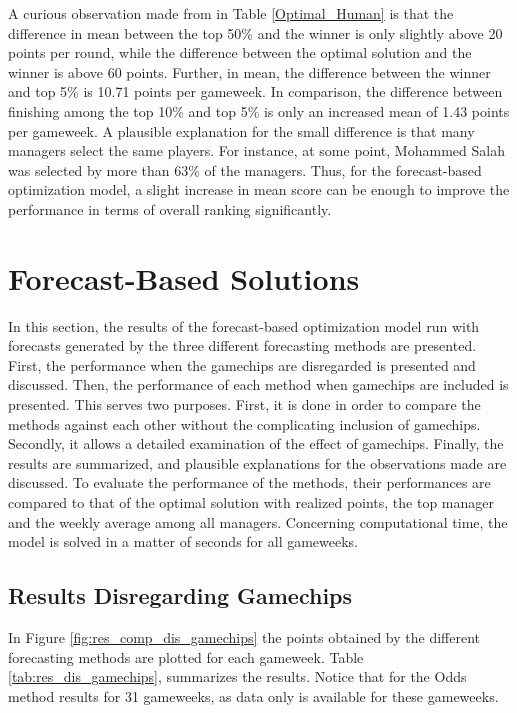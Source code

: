 A curious observation made from in Table \ref{Optimal_Human} is that the difference in mean between the top 50\% and the winner is only slightly above 20 points per round, while the difference between the optimal solution and the winner is above 60 points. Further, in mean, the difference between the winner and top 5\% is 10.71 points per gameweek. In comparison, the difference between finishing among the top 10\% and top 5\% is only an increased mean of 1.43 points per gameweek. A plausible explanation for the small difference is that many managers select the same players. For instance, at some point, Mohammed Salah was selected by more than 63\% of the managers. Thus, for the forecast-based optimization model, a slight increase in mean score can be enough to improve the performance in terms of overall ranking significantly.


\section{Forecast-Based Solutions}\label{sec:inexact}


In this section, the results of the forecast-based optimization model run with forecasts generated by the three different forecasting methods are presented. First, the performance when the gamechips are disregarded is presented and discussed. Then, the performance of each method when gamechips are included is presented. This serves two purposes. First, it is done in order to compare the methods against each other without the complicating inclusion of gamechips. Secondly, it allows a detailed examination of the effect of gamechips. Finally, the results are summarized, and plausible explanations for the observations made are discussed. To evaluate the performance of the methods, their performances are compared to that of the optimal solution with realized points, the top manager and the weekly average among all managers. Concerning computational time, the model is solved in a matter of seconds for all gameweeks.

\subsection{Results Disregarding Gamechips}

In Figure \ref{fig:res_comp_dis_gamechips} the points obtained by the different forecasting methods are plotted for each gameweek. Table \ref{tab:res_dis_gamechips}, summarizes the results. Notice that for the Odds method results for 31 gameweeks, as data only is available for these gameweeks.

